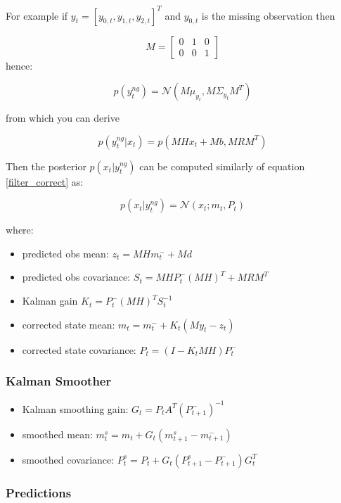 \documentclass{article}
\begin{document}
For example if $y_t = [y_{0,t}, y_{1,t}, y_{2,t}]^T$ and $y_{0,t}$ is the missing observation then

$$ M = \left[\begin{array}{ccc}
    0 & 1 & 0 \\
    0 & 0 & 1
\end{array}\right]$$
hence:

$$ p(y^{ng}_t) = \mathcal{N}(M\mu_{y_t},  M\Sigma_{y_t}M^T)$$

from which you can derive

\begin{equation}\label{filter_correct_obs_missing}
    p(y^{ng}_t|x_t) = p(MHx_t + Mb, MRM^T) 
\end{equation}

Then the posterior $p(x_t|y_t^{ng})$ can be computed similarly of equation \ref{filter_correct} as:

\begin{equation}\label{filter_correct_missing}
 p(x_t|y^{ng}_t) = \mathcal{N}(x_t; m_t, P_t)   
\end{equation}
    
where:

\begin{itemize}
    \item predicted obs mean: $z_t = MHm_t^- + Md$   
    \item predicted obs covariance: $S_t = MHP_t^-(MH)^T + MRM^T$
    \item Kalman gain $K_t = P_t^-(MH)^TS_t^{-1}$ 
    \item corrected state mean: $m_t = m_t^- + K_t(My_t - z_t)$ 
    \item corrected state covariance: $P_t = (I-K_tMH)P_t^-$ 
\end{itemize}

\subsubsection{Kalman Smoother}

\begin{itemize}
    \item Kalman smoothing gain: $G_t = P_tA^T(P_{t+1}^-)^{-1}$
    \item smoothed mean: $m_t^s = m_t + G_t(m_{t+1}^s - m_{t+1}^-)$
    \item smoothed covariance: $P_t^s = P_t + G_t(P_{t+1}^s - P_{t+1}^-)G_t^T$
\end{itemize}

\subsubsection{Predictions}
\end{document}
